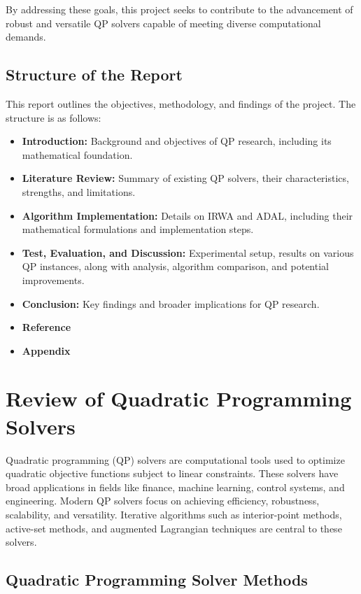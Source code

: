 \documentclass{article}
\begin{document}
By addressing these goals, this project seeks to contribute to the advancement of robust and versatile QP solvers capable of meeting diverse computational demands.

\subsection{Structure of the Report}

This report outlines the objectives, methodology, and findings of the project. The structure is as follows:
\begin{itemize}
    \item \textbf{Introduction:} Background and objectives of QP research, including its mathematical foundation.
    \item \textbf{Literature Review:} Summary of existing QP solvers, their characteristics, strengths, and limitations.
    \item \textbf{Algorithm Implementation:} Details on IRWA and ADAL, including their mathematical formulations and implementation steps.
\item \textbf{Test, Evaluation, and Discussion:} Experimental setup, results on various QP instances, along with analysis, algorithm comparison, and potential improvements.
    \item \textbf{Conclusion:} Key findings and broader implications for QP research.
    \item \textbf{Reference}
    \item \textbf{Appendix}
\end{itemize}

\section{Review of Quadratic Programming Solvers}
Quadratic programming (QP) solvers are computational tools used to optimize quadratic objective functions subject to linear constraints. These solvers have broad applications in fields like finance, machine learning, control systems, and engineering. Modern QP solvers focus on achieving efficiency, robustness, scalability, and versatility. Iterative algorithms such as interior-point methods, active-set methods, and augmented Lagrangian techniques are central to these solvers.

\subsection{Quadratic Programming Solver Methods}
\end{document}
